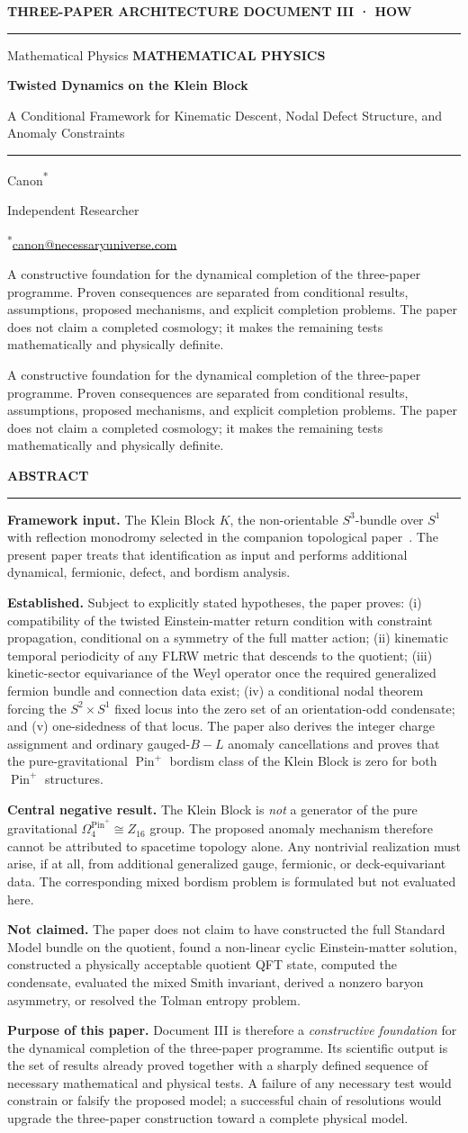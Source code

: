 \documentclass[11pt]{article}
\makeatletter
\theoremstyle{canonmath}
\theoremstyle{canonpostulate}
\theoremstyle{canonclaim}
\providecommand{\Klein}{\mathcal{K}}
\providecommand{\Z}{\mathbb{Z}}
\providecommand{\Sone}{S^1}
\providecommand{\Sthree}{S^3}
\providecommand{\Pin}{\operatorname{Pin}}
\def\mathbb#1{#1}%
\def\mathcal#1{#1}%
\newcommand{\CanonTitlePage}{%
\begin{titlepage}
\thispagestyle{titlepage}
\vspace*{0.62cm}
{\sffamily\footnotesize\bfseries\color{seriesMuted}
THREE-PAPER ARCHITECTURE \hfill \CanonStage\par}
\vspace{0.42cm}
{\color{seriesAccent}\rule{\textwidth}{1.05pt}}\par
\vspace{1.65cm}
\ifx\CanonGenre\empty
\else
{\sffamily\footnotesize\bfseries\color{seriesMuted}\MakeUppercase{\CanonGenre}}\par
\vspace{0.45cm}\fi
{\sffamily\bfseries\fontsize{26}{30}\selectfont\color{seriesInk}\hyphenpenalty=10000\exhyphenpenalty=10000\CanonTitle\par}
\vspace{0.52cm}
{\sffamily\large\color{seriesAccent}\CanonSubtitle\par}
\vspace{0.78cm}
{\color{seriesAccent}\rule{0.24\textwidth}{0.9pt}}\par
\vspace{0.95cm}
{\normalsize\sffamily Canon\textsuperscript{*}\;\orcidlink{0009-0001-9037-6209}\par}
\vspace{0.25cm}
{\small\sffamily\color{seriesMuted}Independent Researcher\par}
\vspace{0.16cm}
{\small\sffamily\color{seriesMuted}\textsuperscript{*}\href{mailto:canon@necessaryuniverse.com}{canon@necessaryuniverse.com}\par}
\vfill
\ifx\CanonDeck\empty
\else
\begin{tcolorbox}[
  enhanced,
  colback=seriesPaper,
  colframe=seriesRule,
  boxrule=0.45pt,
  leftrule=2.4pt,
  arc=1.5pt,
  left=11pt,right=11pt,top=9pt,bottom=9pt,
  width=0.94\textwidth
]
\small\sffamily\color{seriesMuted}
\CanonDeck
\end{tcolorbox}
\vspace{0.65cm}
\fi
\end{titlepage}
}
\newenvironment{CanonAbstract}{%
  \begin{center}
  {\sffamily\footnotesize\bfseries\color{seriesMuted}\MakeUppercase{Abstract}}\\[-0.05em]
  {\color{seriesAccent}\rule{0.16\textwidth}{0.75pt}}
  \end{center}
  \begin{tcolorbox}[
    enhanced,
    breakable,
    colback=white,
    colframe=seriesRule,
    boxrule=0.4pt,
    leftrule=2.2pt,
    arc=1pt,
    left=12pt,right=12pt,top=9pt,bottom=9pt,
    before skip=5pt,after skip=4pt
  ]
  \small
}{%
  \end{tcolorbox}
}
\newcommand{\CanonStage}{DOCUMENT III · HOW}
\newcommand{\CanonGenre}{Mathematical Physics}
\newcommand{\CanonTitle}{Twisted Dynamics on the Klein Block}
\newcommand{\CanonSubtitle}{A Conditional Framework for Kinematic Descent, Nodal Defect Structure, and Anomaly Constraints}
\newcommand{\CanonDeck}{A constructive foundation for the dynamical completion of the three-paper programme. Proven consequences are separated from conditional results, assumptions, proposed mechanisms, and explicit completion problems. The paper does not claim a completed cosmology; it makes the remaining tests mathematically and physically definite.}
\makeatother
\begin{document}
\hypersetup{pageanchor=false}
\CanonTitlePage
\hypersetup{pageanchor=true}

\setcounter{page}{1}

\begin{CanonAbstract}
\textbf{Framework input.} The Klein Block $\Klein$, the non-orientable $\Sthree$-bundle over $\Sone$ with reflection monodromy selected in the companion topological paper~\cite{CanonWhat}. The present paper treats that identification as input and performs additional dynamical, fermionic, defect, and bordism analysis.

\textbf{Established.} Subject to explicitly stated hypotheses, the paper proves: (i) compatibility of the twisted Einstein-matter return condition with constraint propagation, conditional on a symmetry of the full matter action; (ii) kinematic temporal periodicity of any FLRW metric that descends to the quotient; (iii) kinetic-sector equivariance of the Weyl operator once the required generalized fermion bundle and connection data exist; (iv) a conditional nodal theorem forcing the $S^2\times S^1$ fixed locus into the zero set of an orientation-odd condensate; and (v) one-sidedness of that locus. The paper also derives the integer charge assignment and ordinary gauged-$B-L$ anomaly cancellations and proves that the pure-gravitational $\Pin^+$ bordism class of the Klein Block is zero for both $\Pin^+$ structures.

\textbf{Central negative result.} The Klein Block is \emph{not} a generator of the pure gravitational $\Omega_4^{\Pin^+}\cong\Z_{16}$ group. The proposed anomaly mechanism therefore cannot be attributed to spacetime topology alone. Any nontrivial realization must arise, if at all, from additional generalized gauge, fermionic, or deck-equivariant data. The corresponding mixed bordism problem is formulated but not evaluated here.

\textbf{Not claimed.} The paper does not claim to have constructed the full Standard Model bundle on the quotient, found a non-linear cyclic Einstein-matter solution, constructed a physically acceptable quotient QFT state, computed the condensate, evaluated the mixed Smith invariant, derived a nonzero baryon asymmetry, or resolved the Tolman entropy problem.

\textbf{Purpose of this paper.} Document III is therefore a \emph{constructive foundation} for the dynamical completion of the three-paper programme. Its scientific output is the set of results already proved together with a sharply defined sequence of necessary mathematical and physical tests. A failure of any necessary test would constrain or falsify the proposed model; a successful chain of resolutions would upgrade the three-paper construction toward a complete physical model.
\end{CanonAbstract}
\end{document}
